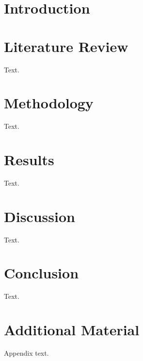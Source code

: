 \documentclass[
  paper=A4,
  12pt,
  twoside=true,
  openright,
  parskip=full,
  chapterprefix=true,
  headings=normal,
  bibliography=totoc,
  listof=totoc,
  titlepage=on,
  captions=tableabove,
  abstract=on
]{scrreprt}
\theoremstyle{definition}
\theoremstyle{remark}
\begin{document}
\tableofcontents
\clearpage

\listoffigures
\clearpage

\listoftables
\clearpage

\setcounter{page}{1}

\chapter{Introduction}



\chapter{Literature Review}
Text.

\chapter{Methodology}
Text.

\chapter{Results}
Text.

\chapter{Discussion}
Text.

\chapter{Conclusion}
Text.

\clearpage
\printbibliography

\appendix
\clearpage

\chapter{Additional Material}
Appendix text.
\end{document}
